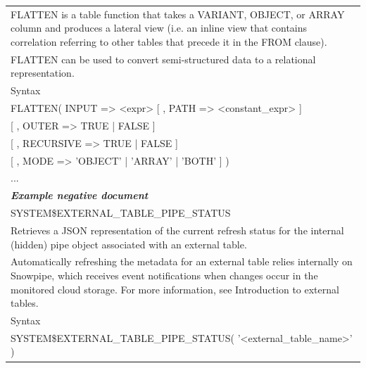\begin{table}[ht]
\begin{tabular}{p{13cm}}
FLATTEN is a table function that takes a VARIANT, OBJECT, or ARRAY column and produces a lateral view (i.e. an inline view that contains correlation referring to other tables that precede it in the FROM clause). \\
FLATTEN can be used to convert semi-structured data to a relational representation. \\
Syntax \\
FLATTEN( INPUT => <expr> [ , PATH => <constant\_expr> ] \\
\hspace{4.35cm} [ , OUTER => TRUE | FALSE ] \\
\hspace{4.35cm} [ , RECURSIVE => TRUE | FALSE ] \\
\hspace{4.35cm} [ , MODE => 'OBJECT' | 'ARRAY' | 'BOTH' ] )  \\
... \\
\midrule
\textit{\textbf{Example negative document}} \\
\midrule
SYSTEM\$EXTERNAL\_TABLE\_PIPE\_STATUS \\
Retrieves a JSON representation of the current refresh status for the internal (hidden) pipe object associated with an external table. \\
Automatically refreshing the metadata for an external table relies internally on Snowpipe, which receives event notifications when changes occur in the monitored cloud storage. For more information, see Introduction to external tables. \\
Syntax \\
SYSTEM\$EXTERNAL\_TABLE\_PIPE\_STATUS( '<external\_table\_name>' ) \\


\end{tabular}
\end{table}
